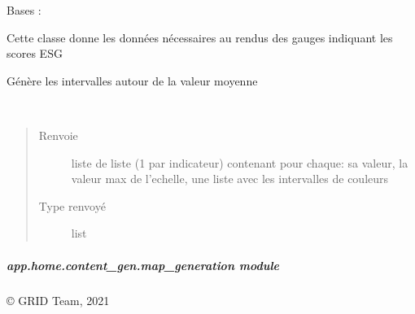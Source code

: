 \documentclass[letterpaper,10pt,french]{sphinxmanual}
\begin{document}
\begin{fulllineitems}
\label{\detokenize{app.home.content_gen:app.home.content_gen.index_renderer.Scoring}}
\sphinxAtStartPar
Bases : 

\sphinxAtStartPar
Cette classe donne les données nécessaires au rendus des gauges indiquant les scores ESG

\begin{fulllineitems}
\label{\detokenize{app.home.content_gen:app.home.content_gen.index_renderer.Scoring.bin}}
\sphinxAtStartPar
Génère les intervalles autour de la valeur moyenne

\end{fulllineitems}


\begin{fulllineitems}
\label{\detokenize{app.home.content_gen:app.home.content_gen.index_renderer.Scoring.main}}~\begin{quote}\begin{description}
\item[{Renvoie}] \leavevmode
\sphinxAtStartPar
liste de liste (1 par indicateur) contenant pour chaque: sa valeur, la valeur max de l’echelle, une liste avec les intervalles de couleurs

\item[{Type renvoyé}] \leavevmode
\sphinxAtStartPar
list

\end{description}\end{quote}

\end{fulllineitems}


\end{fulllineitems}



\subparagraph{app.home.content\_gen.map\_generation module}
\label{\detokenize{app.home.content_gen:module-app.home.content_gen.map_generation}}\label{\detokenize{app.home.content_gen:app-home-content-gen-map-generation-module}}
\sphinxAtStartPar
© GRID Team, 2021
\end{document}
